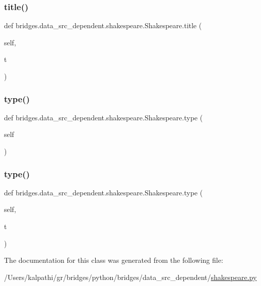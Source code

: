 \subsubsection{\texorpdfstring{title()}{title()}\hspace{0.1cm}{\footnotesize\ttfamily [2/2]}}
{\footnotesize\ttfamily def bridges.\+data\+\_\+src\+\_\+dependent.\+shakespeare.\+Shakespeare.\+title (\begin{DoxyParamCaption}\item[{}]{self,  }\item[{}]{t }\end{DoxyParamCaption})}

\mbox{\label{classbridges_1_1data__src__dependent_1_1shakespeare_1_1_shakespeare_ae2499dd686160849220edc662246e42a}} 
\subsubsection{\texorpdfstring{type()}{type()}\hspace{0.1cm}{\footnotesize\ttfamily [1/2]}}
{\footnotesize\ttfamily def bridges.\+data\+\_\+src\+\_\+dependent.\+shakespeare.\+Shakespeare.\+type (\begin{DoxyParamCaption}\item[{}]{self }\end{DoxyParamCaption})}

\mbox{\label{classbridges_1_1data__src__dependent_1_1shakespeare_1_1_shakespeare_a9b4489402fda80ec8360bb17ad3d0af9}} 
\subsubsection{\texorpdfstring{type()}{type()}\hspace{0.1cm}{\footnotesize\ttfamily [2/2]}}
{\footnotesize\ttfamily def bridges.\+data\+\_\+src\+\_\+dependent.\+shakespeare.\+Shakespeare.\+type (\begin{DoxyParamCaption}\item[{}]{self,  }\item[{}]{t }\end{DoxyParamCaption})}



The documentation for this class was generated from the following file\+:\begin{DoxyCompactItemize}
\item 
/\+Users/kalpathi/gr/bridges/python/bridges/data\+\_\+src\+\_\+dependent/\mbox{\hyperlink{shakespeare_8py}{shakespeare.\+py}}\end{DoxyCompactItemize}
